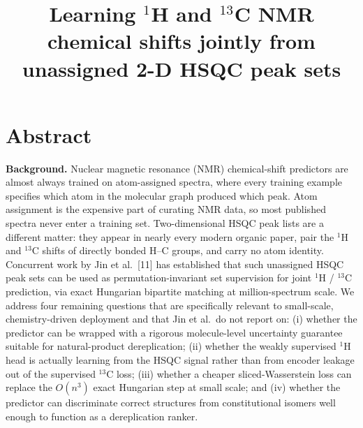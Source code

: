\documentclass[
  11pt,
  a4paper,
]{article}
\title{Learning $^1$H and $^{13}$C NMR chemical shifts jointly from unassigned 2-D HSQC peak sets}
\author{}
\date{}
\begin{document}
\maketitle

\section{Abstract}\label{abstract}

\textbf{Background.} Nuclear magnetic resonance (NMR) chemical-shift
predictors are almost always trained on atom-assigned spectra, where
every training example specifies which atom in the molecular graph
produced which peak. Atom assignment is the expensive part of
curating NMR data, so most published spectra never enter a training
set. Two-dimensional HSQC peak lists are a different matter: they
appear in nearly every modern organic paper, pair the \(^{1}\)H and
\(^{13}\)C shifts of directly bonded H--C groups, and carry no atom
identity. Concurrent work by Jin et al.~{[}11{]} has established that
such unassigned HSQC peak sets can be used as permutation-invariant
set supervision for joint \(^{1}\)H / \(^{13}\)C prediction, via exact
Hungarian bipartite matching at million-spectrum scale. We address
four remaining questions that are specifically relevant to
small-scale, chemistry-driven deployment and that Jin et al.~do not
report on: (i) whether the predictor can be wrapped with a
rigorous molecule-level uncertainty guarantee suitable for
natural-product dereplication; (ii) whether the weakly supervised
\(^{1}\)H head is actually learning from the HSQC signal rather than
from encoder leakage out of the supervised \(^{13}\)C loss;
(iii) whether a cheaper sliced-Wasserstein loss can replace the
\(O(n^{3})\) exact Hungarian step at small scale; and (iv) whether
the predictor can discriminate correct structures from
constitutional isomers well enough to function as a dereplication
ranker.
\end{document}
